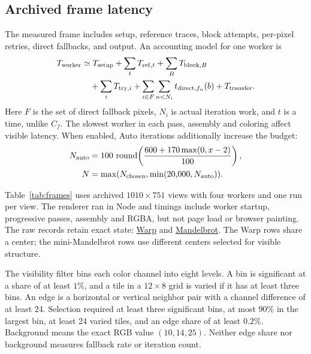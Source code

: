 \documentclass[11pt,a4paper]{article}
\numberwithin{equation}{section}
\begin{document}
\subsection{Archived frame latency}

The measured frame includes setup, reference traces, block attempts,
per-pixel retries, direct fallbacks, and output. An accounting model
for one worker is
\begin{align}
  T_{\rm worker}
    &\simeq T_{\rm setup}+\sum_t T_{{\rm ref},t}
                      +\sum_B T_{{\rm block},B} \notag\\
    &\quad+\sum_i T_{{\rm try},i}
       +\sum_{i\in F}\sum_{n<N_i} t_{{\rm direct},f_n}(b)
       +T_{\rm transfer}.
\end{align}
Here \(F\) is the set of direct fallback pixels, \(N_i\) is actual
iteration work, and \(t\) is a time, unlike \(C_f\). The slowest
worker in each pass, assembly and coloring affect visible latency.
When enabled, Auto iterations additionally increase the budget:
\begin{align*}
  N_{\rm auto}
    &=100\,\operatorname{round}\!\left(
               \frac{600+170\max(0,x-2)}{100}\right),\\
  N&=\max(N_{\rm chosen},\min(20{,}000,N_{\rm auto})).
\end{align*}

Table~\ref{tab:frames} uses archived \(1010\times751\) views with
four workers and one run per view. The renderer ran in Node and
timings include worker startup, progressive passes, assembly and RGBA,
but not page load or browser painting. The raw records retain exact
state: \href{data/zoom-detail-1010x751-warp11-warpLink-warp14.json}{Warp}
and \href{data/zoom-detail-1010x751-mandel18-mandelUser-mini12-mini18-mini40-mini100.json}{Mandelbrot}.
The Warp rows share a center; the mini-Mandelbrot rows use different
centers selected for visible structure.

The visibility filter bins each color channel into eight levels.
A bin is significant at a share of at least \(1\%\), and a tile in
a \(12\times8\) grid is varied if it has at least three bins. An edge
is a horizontal or vertical neighbor pair with a channel difference
of at least 24. Selection required at least three significant bins,
at most \(90\%\) in the largest bin, at least 24 varied tiles, and
an edge share of at least \(0.2\%\). Background means the exact
RGB value \((10,14,25)\). Neither edge share nor background measures
fallback rate or iteration count.
\end{document}
